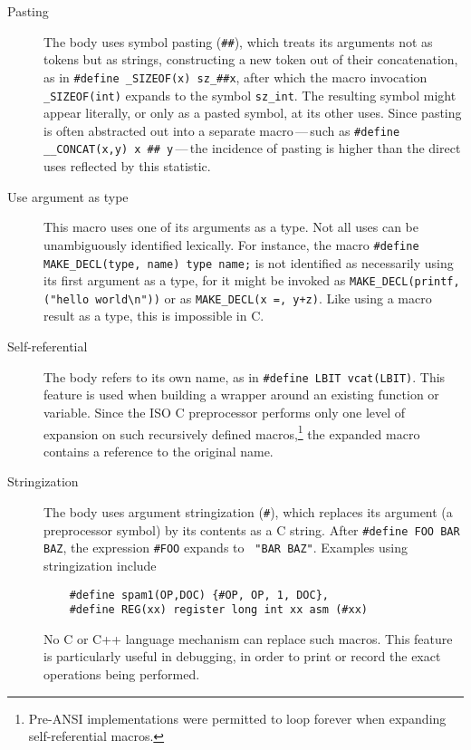 \begin{description}
\item[Pasting]\label{def:pasting}
  The body uses symbol pasting ({\tt \#\#}), which treats its arguments not
  as tokens but as strings, constructing a new token out of their
  concatenation, as in {\tt \#define \verb|_SIZEOF|(x) \verb|sz_|\#\#x},
  after which the macro invocation {\tt \verb|_SIZEOF|(int)} expands to the
  symbol {\tt \verb|sz_int|}.  The resulting symbol might appear literally, or
  only as a pasted symbol, at its other uses.  Since pasting is often
  abstracted out into a separate macro\,---\,such as {\tt \#define
  \verb|__CONCAT|(x,y) x \#\# y}\,---\,the incidence of pasting is higher
  than the direct uses reflected by this statistic.

\item[Use argument as type]
  This macro uses one of its arguments as a type.  Not all uses can be
  unambiguously identified lexically.  For instance, the macro 
  {\tt \#define \verb|MAKE_DECL|(type, name) type name;}
  is not identified as necessarily using its first argument as a type, for
  it might be invoked as {\tt \verb|MAKE_DECL|(printf, ("hello
  world\verb|\|n"))} or as {\tt \verb|MAKE_DECL|(x =, y+z)}.
  Like using a macro result
  as a type, this is impossible in C\@.

\item[Self-referential]
  The body refers to its own name, as in {\tt \#define LBIT vcat(LBIT)}.
  This feature is used when building a wrapper around an existing function
  or variable.  Since the ISO C preprocessor performs only one level of
  expansion on such recursively defined macros,\footnote{Pre-ANSI
    implementations were permitted to loop forever when expanding
    self-referential macros.} the expanded macro contains a reference to
  the original name.

\item[Stringization]
  The body uses argument stringization ({\tt \#}), which replaces its
  argument (a preprocessor symbol) by its contents as a C string.  After
  {\tt \#define FOO BAR BAZ}, the expression {\tt \#FOO} expands to {\tt
  "BAR~BAZ"}.  Examples using stringization include
\begin{verbatim}
    #define spam1(OP,DOC) {#OP, OP, 1, DOC},
    #define REG(xx) register long int xx asm (#xx)
\end{verbatim}
  No C or C++ language mechanism can replace such macros.  This feature is
  particularly useful in debugging, in order to print or record the exact
  operations being performed.

\end{description}


